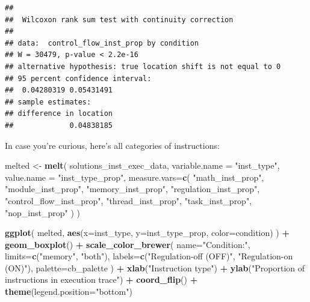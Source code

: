 \documentclass[]{book}
\newenvironment{Shaded}{\begin{snugshade}}{\end{snugshade}}
\newcommand{\DataTypeTok}[1]{\textcolor[rgb]{0.13,0.29,0.53}{#1}}
\newcommand{\KeywordTok}[1]{\textcolor[rgb]{0.13,0.29,0.53}{\textbf{#1}}}
\newcommand{\NormalTok}[1]{#1}
\newcommand{\OperatorTok}[1]{\textcolor[rgb]{0.81,0.36,0.00}{\textbf{#1}}}
\newcommand{\StringTok}[1]{\textcolor[rgb]{0.31,0.60,0.02}{#1}}
\begin{document}
\begin{verbatim}
## 
##  Wilcoxon rank sum test with continuity correction
## 
## data:  control_flow_inst_prop by condition
## W = 30479, p-value < 2.2e-16
## alternative hypothesis: true location shift is not equal to 0
## 95 percent confidence interval:
##  0.04280319 0.05431491
## sample estimates:
## difference in location 
##             0.04838185
\end{verbatim}

In case you're curious, here's all categories of instructions:

\begin{Shaded}
\begin{Highlighting}[]
\NormalTok{melted <-}\StringTok{ }\KeywordTok{melt}\NormalTok{(}
\NormalTok{  solutions_inst_exec_data,}
  \DataTypeTok{variable.name =} \StringTok{"inst_type"}\NormalTok{,}
  \DataTypeTok{value.name =} \StringTok{"inst_type_prop"}\NormalTok{,}
  \DataTypeTok{measure.vars=}\KeywordTok{c}\NormalTok{(}
    \StringTok{"math_inst_prop"}\NormalTok{,}
    \StringTok{"module_inst_prop"}\NormalTok{,}
    \StringTok{"memory_inst_prop"}\NormalTok{,}
    \StringTok{"regulation_inst_prop"}\NormalTok{,}
    \StringTok{"control_flow_inst_prop"}\NormalTok{,}
    \StringTok{"thread_inst_prop"}\NormalTok{,}
    \StringTok{"task_inst_prop"}\NormalTok{,}
    \StringTok{"nop_inst_prop"}
\NormalTok{  )}
\NormalTok{)}

\KeywordTok{ggplot}\NormalTok{( melted, }\KeywordTok{aes}\NormalTok{(}\DataTypeTok{x=}\NormalTok{inst_type, }\DataTypeTok{y=}\NormalTok{inst_type_prop, }\DataTypeTok{color=}\NormalTok{condition) ) }\OperatorTok{+}
\StringTok{  }\KeywordTok{geom_boxplot}\NormalTok{() }\OperatorTok{+}
\StringTok{  }\KeywordTok{scale_color_brewer}\NormalTok{(}
    \DataTypeTok{name=}\StringTok{"Condition:"}\NormalTok{,}
    \DataTypeTok{limits=}\KeywordTok{c}\NormalTok{(}\StringTok{"memory"}\NormalTok{, }\StringTok{"both"}\NormalTok{),}
    \DataTypeTok{labels=}\KeywordTok{c}\NormalTok{(}\StringTok{"Regulation-off (OFF)"}\NormalTok{, }\StringTok{"Regulation-on (ON)"}\NormalTok{),}
    \DataTypeTok{palette=}\NormalTok{cb_palette}
\NormalTok{  ) }\OperatorTok{+}
\StringTok{  }\KeywordTok{xlab}\NormalTok{(}\StringTok{"Instruction type"}\NormalTok{) }\OperatorTok{+}
\StringTok{  }\KeywordTok{ylab}\NormalTok{(}\StringTok{"Proportion of instructions in execution trace"}\NormalTok{) }\OperatorTok{+}
\StringTok{  }\KeywordTok{coord_flip}\NormalTok{() }\OperatorTok{+}
\StringTok{  }\KeywordTok{theme}\NormalTok{(}\DataTypeTok{legend.position=}\StringTok{"bottom"}\NormalTok{)}
\end{Highlighting}
\end{Shaded}
\end{document}

